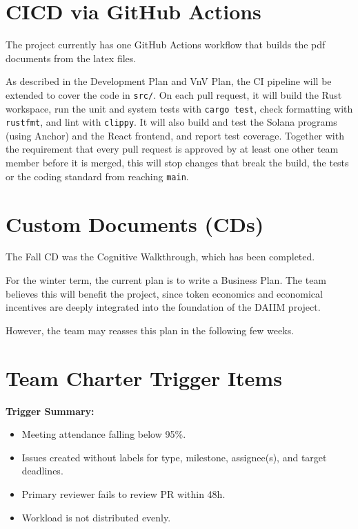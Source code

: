 \documentclass{article}
\begin{document}
\section{CICD via GitHub Actions}

The project currently has one GitHub Actions workflow that builds the pdf documents from the latex files. 

As described in the Development Plan and VnV Plan, the CI pipeline will be
extended to cover the code in \texttt{src/}. On each pull request, it will build
the Rust workspace, run the unit and system tests with \texttt{cargo test},
check formatting with \texttt{rustfmt}, and lint with \texttt{clippy}. It will
also build and test the Solana programs (using Anchor) and the React frontend,
and report test coverage. Together with the requirement that every pull request
is approved by at least one other team member before it is merged, this will
stop changes that break the build, the tests or the coding standard from
reaching \texttt{main}. 

\section{Custom Documents (CDs)}

The Fall CD was the Cognitive Walkthrough, which has been completed.

For the winter term, the current plan is to write a Business Plan. The team believes this will
benefit the project, since token economics and economical incentives are deeply integrated into the 
foundation of the DAIIM project.

However, the team may reasses this plan in the following few weeks.


\section{Team Charter Trigger Items}

\textbf{Trigger Summary:}
\begin{itemize}
    \item Meeting attendance falling below 95\%.
    \item Issues created without labels for type, milestone, assignee(s), and target deadlines.
    \item Primary reviewer fails to review PR within 48h.
    \item Workload is not distributed evenly.
\end{itemize}
\end{document}
